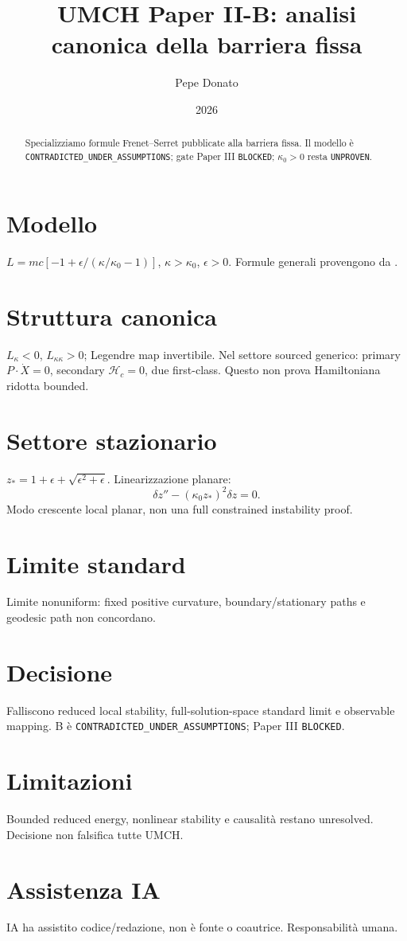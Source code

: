 \documentclass[11pt,a4paper]{article}
\title{UMCH Paper II-B: analisi canonica della barriera fissa}
\author{Pepe Donato}\date{2026}
\begin{document}
\maketitle
\begin{abstract}Specializziamo formule Frenet--Serret pubblicate alla barriera fissa. Il modello è \texttt{CONTRADICTED\_UNDER\_ASSUMPTIONS}; gate Paper III \texttt{BLOCKED}; $\kappa_0>0$ resta \texttt{UNPROVEN}.\end{abstract}
\section{Modello}\label{sec:p2b-model}
$L=mc[-1+\epsilon/(\kappa/\kappa_0-1)]$, $\kappa>\kappa_0$, $\epsilon>0$. Formule generali provengono da \cite{ArreagaCapovillaGuven2001,CapovillaGuvenRojas2002}.
\section{Struttura canonica}\label{sec:p2b-canonical}
$L_\kappa<0$, $L_{\kappa\kappa}>0$; Legendre map invertibile. Nel settore sourced generico: primary $P\cdot\dot X=0$, secondary $\mathcal H_c=0$, due first-class. Questo non prova Hamiltoniana ridotta bounded.
\section{Settore stazionario}\label{sec:p2b-stationary}
$z_*=1+\epsilon+\sqrt{\epsilon^2+\epsilon}$. Linearizzazione planare:
\[\delta z''-(\kappa_0z_*)^2\delta z=0.\]
Modo crescente local planar, non una full constrained instability proof.
\section{Limite standard}\label{sec:p2b-limit}
Limite nonuniform: fixed positive curvature, boundary/stationary paths e geodesic path non concordano.
\section{Decisione}\label{sec:p2b-gate}
Falliscono reduced local stability, full-solution-space standard limit e observable mapping. B è \texttt{CONTRADICTED\_UNDER\_ASSUMPTIONS}; Paper III \texttt{BLOCKED}.
\section{Limitazioni}\label{sec:p2b-limits}
Bounded reduced energy, nonlinear stability e causalità restano unresolved. Decisione non falsifica tutte UMCH.
\section{Assistenza IA}\label{sec:p2b-ai}
IA ha assistito codice/redazione, non è fonte o coautrice. Responsabilità umana.

\end{document}
